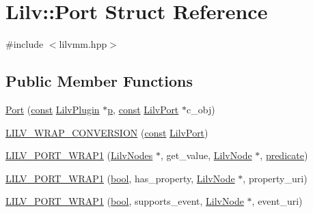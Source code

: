 \hypertarget{struct_lilv_1_1_port}{}\section{Lilv\+:\+:Port Struct Reference}
\label{struct_lilv_1_1_port}


{\ttfamily \#include $<$lilvmm.\+hpp$>$}

\subsection*{Public Member Functions}
\begin{DoxyCompactItemize}
\item 
\hyperlink{struct_lilv_1_1_port_a215c0b4f2619d85157e239bac8e4f85a}{Port} (\hyperlink{getopt1_8c_a2c212835823e3c54a8ab6d95c652660e}{const} \hyperlink{lilv_8h_a94e36303167a78a0c392f881136b461b}{Lilv\+Plugin} $\ast$\hyperlink{xmltok_8h_a94b60f3beb36ae85555d36dc9816769c}{p}, \hyperlink{getopt1_8c_a2c212835823e3c54a8ab6d95c652660e}{const} \hyperlink{lilv_8h_a772dad64b72690372c1f78314012bda5}{Lilv\+Port} $\ast$c\+\_\+obj)
\item 
\hyperlink{struct_lilv_1_1_port_a5efe49f0ee017cfaedf67684508772f7}{L\+I\+L\+V\+\_\+\+W\+R\+A\+P\+\_\+\+C\+O\+N\+V\+E\+R\+S\+I\+ON} (\hyperlink{getopt1_8c_a2c212835823e3c54a8ab6d95c652660e}{const} \hyperlink{lilv_8h_a772dad64b72690372c1f78314012bda5}{Lilv\+Port})
\item 
\hyperlink{struct_lilv_1_1_port_aa156077333cd879756ea04c94df1ffab}{L\+I\+L\+V\+\_\+\+P\+O\+R\+T\+\_\+\+W\+R\+A\+P1} (\hyperlink{lilv_8h_a256c2c4443307f320de24bb31198df83}{Lilv\+Nodes} $\ast$, get\+\_\+value, \hyperlink{lilv_8h_ae183dca3dca5368d34dbd863a405437b}{Lilv\+Node} $\ast$, \hyperlink{xlmath_8c_a767c5fa064d0a1e1f8b447769f1a890b}{predicate})
\item 
\hyperlink{struct_lilv_1_1_port_a5ac3964b0e3fe9403497d6d7abc9e6f1}{L\+I\+L\+V\+\_\+\+P\+O\+R\+T\+\_\+\+W\+R\+A\+P1} (\hyperlink{mac_2config_2i386_2lib-src_2libsoxr_2soxr-config_8h_abb452686968e48b67397da5f97445f5b}{bool}, has\+\_\+property, \hyperlink{lilv_8h_ae183dca3dca5368d34dbd863a405437b}{Lilv\+Node} $\ast$, property\+\_\+uri)
\item 
\hyperlink{struct_lilv_1_1_port_a4f9c9fddff817193d49bbc0897ae410c}{L\+I\+L\+V\+\_\+\+P\+O\+R\+T\+\_\+\+W\+R\+A\+P1} (\hyperlink{mac_2config_2i386_2lib-src_2libsoxr_2soxr-config_8h_abb452686968e48b67397da5f97445f5b}{bool}, supports\+\_\+event, \hyperlink{lilv_8h_ae183dca3dca5368d34dbd863a405437b}{Lilv\+Node} $\ast$, event\+\_\+uri)

\end{DoxyCompactItemize}
